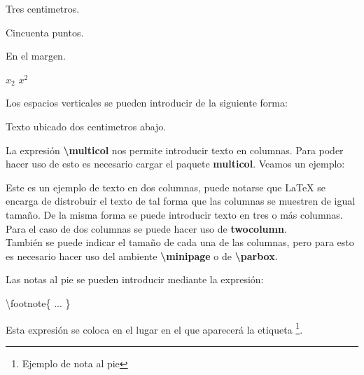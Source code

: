 \documentclass[letterpaper,11pt]{article}
\begin{document}
\begin{•}
\hspace{3cm}Tres centimetros.

\hspace{50pt}Cincuenta puntos.

\hspace{-3cm}En el margen.

$x_{2}$ \hspace{4cm} $x^{2}$

Los espacios verticales se pueden introducir de la siguiente forma:

\vspace{2cm}Texto ubicado dos centimetros abajo.




La expresión \textbf{\textbackslash multicol} nos permite introducir texto en columnas. Para poder hacer uso de esto es necesario cargar el paquete \textbf{multicol}. Veamos un ejemplo:

\begin{multicols}{2}
Este es  un ejemplo de texto en dos columnas, puede notarse que \LaTeX{} se encarga de distrobuir el texto de tal forma que las columnas se muestren de igual tamaño. De la misma forma se puede introducir texto en tres o más columnas.\\
Para el caso de dos columnas se puede hacer uso de \textbf{twocolumn}.\\
También se puede indicar el tamaño de cada una de las columnas, pero para esto es necesario hacer uso del ambiente \textbf{\textbackslash minipage} 
o de \textbf{\textbackslash parbox}.
\end{multicols}

\pagebreak


Las notas al pie se pueden introducir mediante la expresión:
\begin{center}
\textbackslash footnote\{ ... \}
\end{center}
Esta expresión se coloca en el lugar en el que aparecerá la etiqueta \footnote{Ejemplo de nota al pie}.


\end{•}
\end{document}
